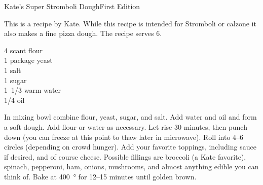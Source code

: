 \begin{entry}{Kate's Super Stromboli Dough}{First Edition}
\label{sec:stromboli}

\begin{open}
  This is a recipe by Kate.  While this recipe is intended for Stromboli
  or calzone it also makes a fine pizza dough.  The
  recipe serves 6.
\end{open}
\begin{ingredients}
  4 scant \si{\cup} flour \\
  1 package  yeast \\
  \SI{1}{\teaspoon} salt \\
  \SI{1}{\tblspoon} sugar \\
  \SI{1/3}[1]{\cup} warm water \\
  \SI{1/4}{\cup} oil
\end{ingredients}
In mixing bowl combine flour, yeast, sugar, and salt.  Add water and oil and
form a soft dough. Add flour or water as necessary.  Let rise 30 minutes, then
punch down (you can freeze at this point to thaw later in microwave).  Roll
into \numrange{4}{6} circles (depending on crowd hunger). Add your favorite
toppings, including sauce if desired, and of course cheese. Possible fillings
are broccoli (a Kate favorite), spinach, pepperoni, ham, onions, mushrooms,
and almost anything edible you can think of. Bake at \SI{400}{\degree} for
\numrange{12}{15} minutes until golden brown.
\end{entry}

